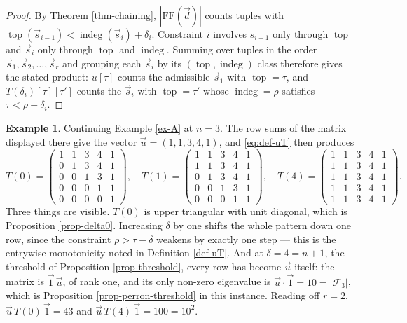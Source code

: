 \documentclass[11pt, a4paper, abstract=yes]{scrartcl}
\theoremstyle{definition}
\newtheorem{mexample}[definition]{Example}
\theoremstyle{remark}
\theoremstyle{plain}
\newcommand{\indeg}{\operatorname{indeg}}
\newcommand{\tp}{\operatorname{top}}
\begin{document}
\begin{proof}
By Theorem \ref{thm-chaining}, \(|\mathrm{FF}(\vec d)|\) counts tuples with
\(\tp(\vec s_{i-1})<\indeg(\vec s_i)+\delta_i\). Constraint \(i\) involves \(s_{i-1}\) only through \(\tp\) and
\(\vec s_i\) only through \(\tp\) and \(\indeg\). Summing over tuples in the order \(\vec s_1,\vec s_2,\dots,\vec s_r\)
and grouping each \(\vec s_i\) by its \((\tp,\indeg)\) class therefore gives the stated product: \(u[\tau]\)
counts the admissible \(\vec s_1\) with \(\tp=\tau\), and \(T(\delta_i)[\tau][\tau']\) counts the \(\vec s_i\)
with \(\tp=\tau'\) whose \(\indeg=\rho\) satisfies \(\tau<\rho+\delta_i\).
\end{proof}

\begin{mexample}
Continuing Example \ref{ex-A} at \(n=3\). The row sums of the matrix displayed there give the vector
\(\vec u=(1,1,3,4,1)\), and \eqref{eq:def-uT} then produces
\[
  T(0)=\begin{pmatrix}
    1&1&3&4&1\\ 0&1&3&4&1\\ 0&0&1&3&1\\ 0&0&0&1&1\\ 0&0&0&0&1
  \end{pmatrix},
  \quad
  T(1)=\begin{pmatrix}
    1&1&3&4&1\\ 1&1&3&4&1\\ 0&1&3&4&1\\ 0&0&1&3&1\\ 0&0&0&1&1
  \end{pmatrix},
  \quad
  T(4)=\begin{pmatrix}
    1&1&3&4&1\\ 1&1&3&4&1\\ 1&1&3&4&1\\ 1&1&3&4&1\\ 1&1&3&4&1
  \end{pmatrix}.
\]
Three things are visible. \(T(0)\) is upper triangular with unit diagonal, which is
Proposition \ref{prop-delta0}. Increasing \(\delta\) by one shifts the whole pattern down one row, since
the constraint \(\rho>\tau-\delta\) weakens by exactly one step --- this is the entrywise monotonicity
noted in Definition \ref{def-uT}. And at \(\delta=4=n+1\), the threshold of
Proposition \ref{prop-threshold}, every row has become \(\vec u\) itself: the matrix is
\(\vec 1\,\vec u\), of rank one, and its only non-zero eigenvalue is
\(\vec u\cdot\vec 1=10=\lvert\mathcal F_3\rvert\), which is Proposition \ref{prop-perron-threshold} in
this instance. Reading off \(r=2\), \(\vec u\,T(0)\,\vec 1=43\) and \(\vec u\,T(4)\,\vec 1=100=10^2\).
\label{ex-uT}
\end{mexample}
\end{document}
